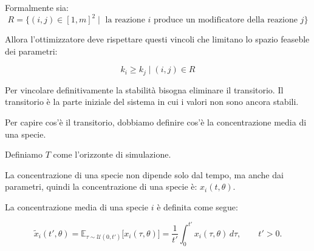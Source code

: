 Formalmente sia: 
\[
    R = \{(i,j) \in [1,m]^2 \mid \text{ la reazione } i \text{ produce un modificatore della reazione } j\}
\]

Allora l'ottimizzatore deve rispettare questi vincoli che limitano lo spazio feaseble dei parametri:

\begin{equation}
\label{eq:relazione}
    k_i \geq  k_j \mid (i,j) \in R
\end{equation}

Per vincolare definitivamente la stabilità bisogna eliminare il transitorio. Il transitorio è la parte
iniziale del sistema in cui i valori non sono ancora stabili.

Per capire cos'è il transitorio, dobbiamo definire cos'è la concentrazione media di una specie.

Definiamo $T$ come l'orizzonte di simulazione.

La concentrazione di una specie non dipende solo dal tempo, ma anche dai parametri, quindi la concentrazione di una specie è: $x_i(t,\theta)$.

La concentrazione media di una specie $i$ è definita come segue:

\begin{equation}
    \tilde{x}_i(t',\theta)
    = \mathbb{E}_{\tau\sim\mathcal{U}(0,t')} \big[ x_i(\tau,\theta) \big]
    = \frac{1}{t'} \int_{0}^{t'} x_i(\tau,\theta)\,d\tau,\qquad t'>0.
\end{equation}

